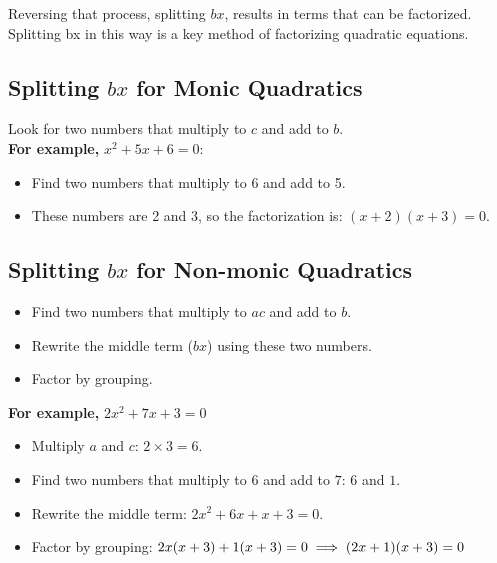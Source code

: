 \documentclass[12pt]{article}
\begin{document}
Reversing that process, splitting $bx$, results in terms that can be factorized. Splitting bx in this way is a key method of factorizing quadratic equations.

\subsection*{Splitting $bx$ for Monic Quadratics}

Look for two numbers that multiply to $c$ and add to $b$.\\

\textbf{For example,} $x^2+5x+6=0$:

\begin{itemize}
\item Find two numbers that multiply to 6 and add to 5.
\item These numbers are 2 and 3, so the factorization is: $(x+2)(x+3)=0$.
\end{itemize}

\subsection*{Splitting $bx$ for Non-monic Quadratics}

\begin{itemize}
\item Find two numbers that multiply to $ac$ and add to $b$.
\item Rewrite the middle term ($bx$) using these two numbers.
\item Factor by grouping.
\end{itemize}

\vspace{24pt}

\textbf{For example,} $2x^2+7x+3=0$
\begin{itemize}
\item Multiply $a$ and $c$: $2\times 3=6$.
\item Find two numbers that multiply to $6$ and add to $7$: $6$ and $1$.
\item Rewrite the middle term: $2x^2+6x+x+3=0$.
\item Factor by grouping: $2x(x+3)+1(x+3)=0\\ \implies (2x+1)(x+3)=0$
\end{itemize}

\vspace{24pt}
\end{document}
